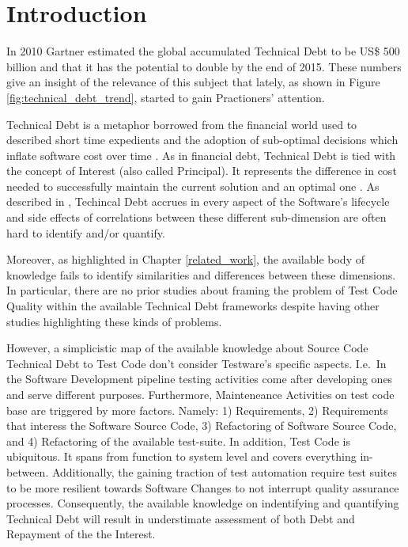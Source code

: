 \chapter{Introduction}

In 2010 Gartner estimated the global accumulated Technical Debt to be US\$ 500 billion \cite{costOfTechnicalDebt} and that it has the potential to double by the end of 2015. These numbers give an insight of the relevance of this subject that lately, as shown in Figure \ref{fig:technical_debt_trend}, started to gain Practioners' attention.

Technical Debt is a metaphor borrowed from the financial world used to described short time expedients and the adoption of sub-optimal decisions which inflate software cost over time \cite{first_mention_of_TD}. As in financial debt, Technical Debt is tied with the concept of Interest (also called Principal). It represents the difference in cost needed to successfully maintain the current solution and an optimal one \cite{technicalDebtInterest}. As described in \cite{mapping_study_td, exploration_of_td, exploration_of_td2}, Techincal Debt accrues in every aspect of the Software's lifecycle and side effects of correlations between these different sub-dimension are often hard to identify and/or quantify.

Moreover, as highlighted in Chapter \ref{related_work}, the available body of knowledge fails to identify similarities and differences between these dimensions. In particular, there are no prior studies about framing the problem of Test Code Quality within the available Technical Debt frameworks despite having other studies highlighting these kinds of problems.

However, a simplicistic map of the available knowledge about Source Code Technical Debt to Test Code don't consider Testware's specific aspects. I.e.\ In the Software Development pipeline testing activities come after developing ones and serve different purposes. Furthermore, Mainteneance Activities on test code base are triggered by more factors. Namely: 1) Requirements, 2) Requirements that interess the Software Source Code, 3) Refactoring of Software Source Code, and 4) Refactoring of the available test-suite. In addition, Test Code is ubiquitous. It spans from function to system level and covers everything in-between. Additionally, the gaining traction of test automation require test suites to be more resilient towards Software Changes to not interrupt quality assurance processes. Consequently, the available knowledge on indentifying and quantifying Technical Debt will result in understimate assessment of both Debt and Repayment of the the Interest.

